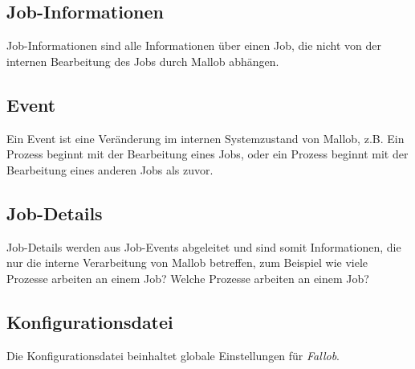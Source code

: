\subsection{Job-Informationen}
Job-Informationen sind alle Informationen über einen Job, die nicht von der internen Bearbeitung des Jobs durch Mallob abhängen. 


\subsection{Event}
Ein Event ist eine Veränderung im internen Systemzustand von Mallob, z.B. Ein Prozess beginnt mit der Bearbeitung eines Jobs, oder ein Prozess beginnt mit der Bearbeitung eines anderen Jobs als zuvor.


\subsection{Job-Details}
Job-Details werden aus Job-Events abgeleitet und sind somit Informationen, die nur die interne Verarbeitung von Mallob betreffen, zum Beispiel wie viele Prozesse arbeiten an einem Job? Welche Prozesse arbeiten an einem Job?


\subsection{Konfigurationsdatei}
Die Konfigurationsdatei beinhaltet globale Einstellungen für \textit{Fallob}.


